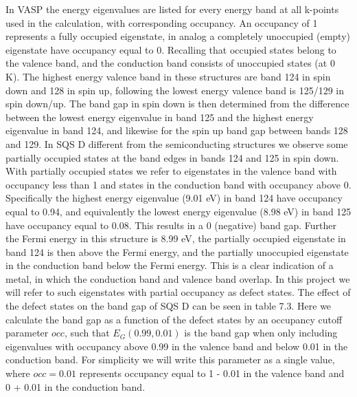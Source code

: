 In VASP the energy eigenvalues are listed for every energy band at all k-points used in the calculation, with corresponding occupancy. An occupancy of 1 represents a fully occupied eigenstate, in analog a completely unoccupied (empty) eigenstate have occupancy equal to 0. Recalling that occupied states belong to the valence band, and the conduction band consists of unoccupied states (at 0 K). The highest energy valence band in these structures are band 124 in spin down and 128 in spin up, following the lowest energy valence band is 125/129 in spin down/up. The band gap in spin down is then determined from the difference between the lowest energy eigenvalue in band 125 and the highest energy eigenvalue in band 124, and likewise for the spin up band gap between bands 128 and 129. In SQS D different from the semiconducting structures we observe some partially occupied states at the band edges in bands 124 and 125 in spin down. With partially occupied states we refer to eigenstates in the valence band with occupancy less than 1 and states in the conduction band with occupancy above 0. Specifically the highest energy eigenvalue (9.01 eV) in band 124 have occupancy equal to 0.94, and equivalently the lowest energy eigenvalue (8.98 eV) in band 125 have occupancy equal to 0.08. This results in a 0 (negative) band gap. Further the Fermi energy in this structure is 8.99 eV, the partially occupied eigenstate in band 124 is then above the Fermi energy, and the partially unoccupied eigenstate in the conduction band below the Fermi energy. This is a clear indication of a metal, in which the conduction band and valence band overlap. In this project we will refer to such eigenstates with partial occupancy as defect states. The effect of the defect states on the band gap of SQS D can be seen in table 7.3. Here we calculate the band gap as a function of the defect states by an occupancy cutoff parameter $occ$, such that $E_G (0.99, 0.01)$ is the band gap when only including eigenvalues with occupancy above 0.99 in the valence band and below 0.01 in the conduction band. For simplicity we will write this parameter as a single value, where $occ = 0.01$ represents occupancy equal to 1 - 0.01 in the valence band and 0 + 0.01 in the conduction band.

